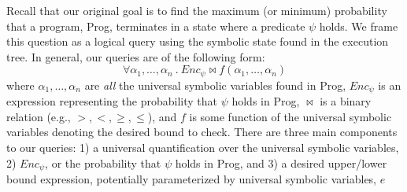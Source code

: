 \documentclass[acmsmall,review,anonymous]{acmart}\settopmatter{printfolios=true,printccs=false,printacmref=false}
\begin{document}
Recall that our original goal is to find the maximum (or minimum) probability that a program, \textsf{Prog}, terminates in a state where a predicate $\psi$ holds.
% 
We frame this question as a logical query using the symbolic state found in the execution tree.
% 
In general, our queries are of the following form:
% 
\begin{equation}
  \label{eq:query}
	\forall \alpha_1,\ldots,\alpha_n~.~Enc_\psi \bowtie f(\alpha_1,\ldots,\alpha_n)
\end{equation}
% 
where $\alpha_1,\ldots,\alpha_n$ are \textit{all} the universal symbolic variables found in \textsf{Prog}, $Enc_\psi$ is an expression representing the probability that $\psi$ holds in \textsf{Prog}, $\bowtie$ is a binary relation (e.g., $>,<,\geq,\leq$), and $f$ is some function of the universal symbolic variables denoting the desired bound to check.
% 
There are three main components to our queries: 1) a universal quantification over the universal symbolic variables, 2) $Enc_\psi$, or the probability that $\psi$ holds in \textsf{Prog}, and 3) a desired upper/lower bound expression, potentially parameterized by universal symbolic variables, $e$
% 
\end{document}
